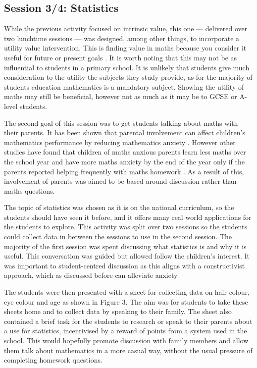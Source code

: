 \documentclass[11pt, a4paper, notitlepage]{article}
\begin{document}
\subsection{Session 3/4: Statistics}

While the previous activity focused on intrinsic value, this one --- delivered over two lunchtime sessions --- was designed, among other things, to incorporate a utility value intervention. This is finding value in maths because you consider it useful for future or present goals \cite{MAES:2024}. It is worth noting that this may not be as influential to students in a primary school. It is unlikely that students give much consideration to the utility the subjects they study provide, as for the majority of students education mathematics is a mandatory subject. Showing the utility of maths may still be beneficial, however not as much as it may be to GCSE or A-level students.
\par
The second goal of this session was to get students talking about maths with their parents. It has been shown that parental involvement can affect children's mathematics performance by reducing mathematics anxiety \cite{Vukovic01052013}. However other studies have found that children of maths anxious parents learn less maths over the school year and have more maths anxiety by the end of the year only if the parents reported helping frequently with maths homework \cite{Maloney:2015}. As a result of this, involvement of parents was aimed to be based around discussion rather than maths questions.
\par
The topic of statistics was chosen as it is on the national curriculum, so the students should have seen it before, and it offers many real world applications for the students to explore. This activity was split over two sessions so the students could collect data in between the sessions to use in the second session. The majority of the first session was spent discussing what statistics is and why it is useful. This conversation was guided but allowed follow the children's interest. It was important to student-centred discussion as this aligns with a constructivist approach, which as discussed before can alleviate anxiety \cite{Finlayson:2014}
\par
 The students were then presented with a sheet for collecting data on hair colour, eye colour and age as shown in Figure 3. 
The aim was for students to take these sheets home and to collect data by speaking to their family. The sheet also contained a brief task for the students to research or speak to their parents about a use for statistics, incentivised by a reward of points from a system used in the school. This would hopefully promote discussion with family members and allow them talk about mathematics in a more casual way, without the usual pressure of completing homework questions.
\end{document}

